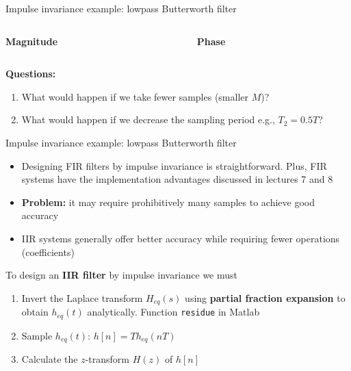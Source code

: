 \documentclass[10pt, aspectratio=169]{beamer}
\begin{document}
%
\begin{frame}{Impulse invariance example: lowpass Butterworth filter}

\begin{columns}
	\begin{column}{0.5\textwidth}
		\textbf{Magnitude}
		\begin{center}
			\resizebox{0.8\linewidth}{!}{}
		\end{center}
	\end{column}
	\begin{column}{0.5\textwidth}
		\textbf{Phase}
		\begin{center}
			\resizebox{0.8\linewidth}{!}{}
		\end{center}
	\end{column}
\end{columns}

\vspace{0.2cm}
\textbf{Questions:}
\begin{enumerate}
	\item What would happen if we take fewer samples (smaller $M$)?
	\item What would happen if we decrease the sampling period e.g., $T_2 = 0.5T$?
\end{enumerate}

\end{frame}

%
\begin{frame}{Impulse invariance example: lowpass Butterworth filter}

\begin{itemize}
	\item Designing FIR filters by impulse invariance is straightforward. Plus, FIR systems have the implementation advantages discussed in lectures 7 and 8
	\item \textbf{Problem:} it may require prohibitively many samples to achieve good accuracy
	\item IIR systems generally offer better accuracy while requiring fewer operations (coefficients)
\end{itemize}

To design an \textbf{IIR filter} by impulse invariance we must

\begin{enumerate}
	\item Invert the Laplace transform $H_{eq}(s)$ using \textbf{partial fraction expansion} to obtain $h_{eq}(t)$ analytically. Function \texttt{residue} in Matlab	
	\item Sample $h_{eq}(t)$: $h[n] = Th_{eq}(nT)$
	\item Calculate the $z$-transform $H(z)$ of $h[n]$
\end{enumerate}
\end{frame}
\end{document}

